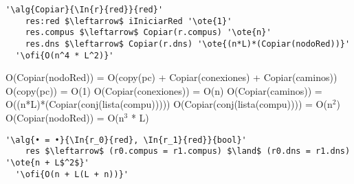 \begin{lstlisting}[mathescape]
'\alg{Copiar}{\In{r}{red}}{red}'
    res:red $\leftarrow$ iIniciarRed '\ote{1}'
    res.compus $\leftarrow$ Copiar(r.compus) '\ote{n}'
    res.dns $\leftarrow$ Copiar(r.dns) '\ote{(n*L)*(Copiar(nodoRed))}'
  '\ofi{O(n^4 * L^2)}'
\end{lstlisting}
O(Copiar(nodoRed)) = O(copy(pc) + Copiar(conexiones) + Copiar(caminos)) \newline
O(copy(pc)) = O(1) \newline
O(Copiar(conexiones)) = O(n)\newline
O(Copiar(caminos)) = O((n*L)*(Copiar(conj(lista(compu))))) \newline
O(Copiar(conj(lista(compu)))) = O(n$^2$) \newline
O(Copiar(nodoRed)) = O(n$^3$ * L) \newline

\begin{lstlisting}[mathescape]
'\alg{• = •}{\In{r_0}{red}, \In{r_1}{red}}{bool}'
    res $\leftarrow$ (r0.compus = r1.compus) $\land$ (r0.dns = r1.dns) '\ote{n + L$^2$}'
  '\ofi{O(n + L(L + n))}'
\end{lstlisting}
